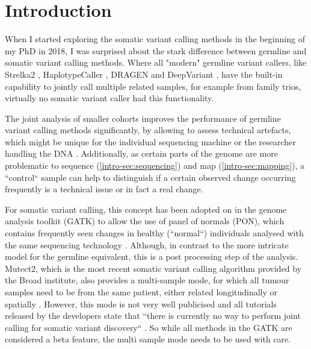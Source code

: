 \section{Introduction}
\label{variantcalling-sec:intro}

When I started exploring the somatic variant calling methods in the beginning of my PhD in 2018, I was surprised about the stark difference between germline and somatic variant calling methods. Where all "modern" germline variant callers, like Strelka2 \cite{Kim2018}, HaplotypeCaller \cite{Poplin2017}, DRAGEN \cite{Miller2015} and DeepVariant \cite{Poplin2018},  have the built-in capability to jointly call multiple related samples, for example from family trios, virtually no somatic variant caller had this functionality. 

The joint analysis of smaller cohorts improves the performance of germline variant calling methods significantly, by allowing to assess technical artefacts, which might be unique for the individual sequencing machine or the researcher handling the DNA \cite{Schirmer2016,Stoler2021}. Additionally, as certain parts of the genome are more problematic to sequence (\autoref{intro-sec:sequencing}) and map (\autoref{intro-sec:mapping}), a ``control`` sample can help to distinguish if a certain observed change occurring frequently is a technical issue or in fact a real change.

For somatic variant calling, this concept has been adopted on in the genome analysis toolkit (GATK) \cite{BrianOConnor2020} to allow the use of panel of normals (PON), which contains frequently seen changes in healthy (``normal``) individuals analysed with the same sequencing technology \cite{GATKTeam2021}. Although, in contrast to the  more intricate model for the germline equivalent, this is a post processing step of the analysis. Mutect2, which is the most recent somatic variant calling algorithm provided by the Broad institute, also provides a multi-sample mode, for which all tumour samples need to be from the same patient, either related longitudinally or spatially \cite{GATKTeam2020}. However, this mode is not very well publicised and all tutorials released by the developers state that ``there is currently no way to perform joint calling for somatic variant discovery`` \cite{GATKTeam2021a}. So while all methods in the GATK are considered a beta feature, the multi sample mode needs to be used with care.

